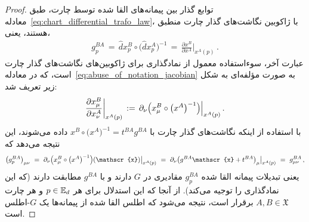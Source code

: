 \begin{proof}
	توابع گذار بین پیمانه‌های القا شده توسط چارت، طبق معادله~\eqref{eq:chart_differential_trafo_law}، با ژاکوبین نگاشت‌های گذار چارت منطبق هستند، یعنی،
	\begin{align}
		g_p^{BA} \,=\, \hat{d}x^B_p \circ \big(\hat{d}x^A_p \big)^{-1} \,=\, \frac{\partial x^B}{\partial x^A} \Big|_{x^A(p)} \,.
	\end{align}
	عبارت آخر، سوءاستفاده معمول از نمادگذاری برای ژاکوبین‌های نگاشت‌های گذار چارت است، که در معادله~\eqref{eq:abuse_of_notation_jacobian} به صورت مؤلفه‌ای به شکل زیر تعریف شد:
	\begin{align}
		\frac{\partial x^B_\mu}{\partial x^A_\nu} \bigg|_{x^A(p)}
		\,:=\,
		\partial_\nu \pig(x^B_\mu \circ \big(x^A\big)^{-1} \pig) \Big|_{x^A(p)} \,.
	\end{align}
	با استفاده از اینکه نگاشت‌های گذار چارت با $x^B \circ \big(x^A\big)^{-1} = t^{BA} g^{BA}$ داده می‌شوند، این نتیجه می‌دهد که
	\begin{align}
		\big( g_p^{BA} \big)_{\mu\nu}
		\ =\ \partial_\nu \pig(x^B_\mu \circ \big(x^A\big)^{-1} \pig) (\mathscr{x}) \big|_{x^A(p)}
		\ =\ \partial_\nu \big( g^{BA} \mathscr{x} + t^{BA} \big)_\mu \big|_{x^A(p)}
		\ =\ g^{BA}_{\mu\nu} \,,
	\end{align}
	یعنی تبدیلات پیمانه القا شده $g_p^{BA}$ مقادیری در $G$ دارند و با $g^{BA}$ مطابقت دارند (که این نمادگذاری را توجیه می‌کند).
	از آنجا که این استدلال برای هر $p\in \mathbb{E}_d$ و هر چارت $A,B \in \mathfrak{X}$ برقرار است، نتیجه می‌شود که اطلس القا شده از پیمانه‌ها یک $G$-اطلس است.
\end{proof}


